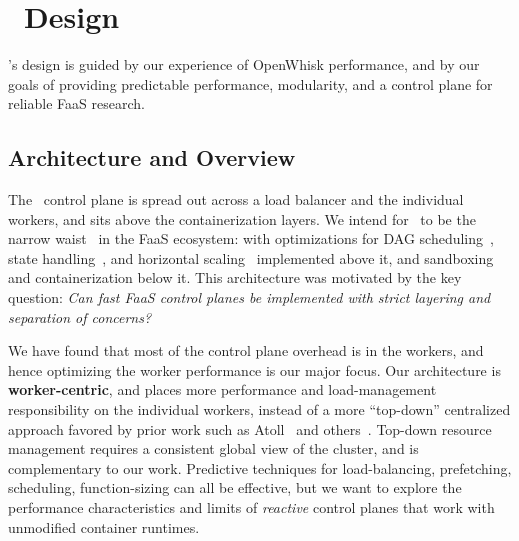 \section{\sysname~Design}
\label{sec:design}


\sysname's design is guided by our experience of OpenWhisk performance, and by our goals of providing predictable performance, modularity, and a control plane for reliable FaaS research.

\subsection{Architecture and Overview}
\label{sec:design:arch}

The \sysname~control plane is spread out across a load balancer and the individual workers, and sits above the containerization layers. 
We intend for \sysname~to be the narrow waist~\cite{popa_http_2010} in the FaaS ecosystem: with optimizations for DAG scheduling~\cite{zhou_qos-aware_2022}, state handling~\cite{sreekanti2020cloudburst}, and horizontal scaling~\cite{faaslb-hpdc22} implemented above it, and sandboxing and containerization below it.  
This architecture was motivated by the key question: \emph{Can fast FaaS control planes be implemented with strict layering and separation of concerns?}


We have found that most of the control plane overhead is in the workers, and hence optimizing the worker performance is our major focus.
%
Our architecture is \textbf{worker-centric}, and places more performance and load-management responsibility on the individual workers, instead of a more ``top-down'' centralized approach favored by prior work such as Atoll~\cite{singhvi2021atoll} and others~\cite{kaffes_centralized_2019, kaffes_hermod_2022}.
Top-down resource management requires a consistent global view of the cluster, and is complementary to our work. 
Predictive techniques for load-balancing, prefetching, scheduling, function-sizing can all be effective, but we want to explore the performance characteristics and limits of \emph{reactive} control planes that work with unmodified container runtimes. 

